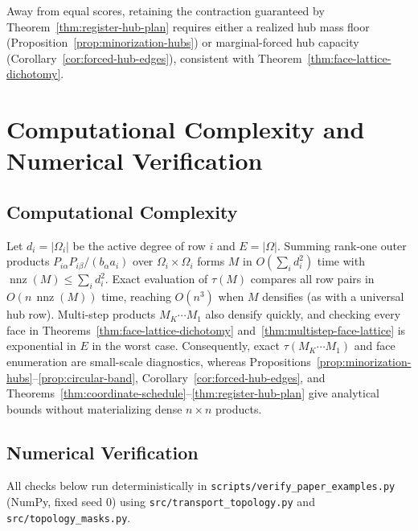 \documentclass[10pt]{article}
\begin{document}
Away from equal scores, retaining the contraction guaranteed by Theorem~\ref{thm:register-hub-plan} requires either a realized hub mass floor (Proposition~\ref{prop:minorization-hubs}) or marginal-forced hub capacity (Corollary~\ref{cor:forced-hub-edges}), consistent with Theorem~\ref{thm:face-lattice-dichotomy}.

\section{Computational Complexity and Numerical Verification}
\label{sec:verification}

\subsection{Computational Complexity}

Let $d_i = |\Omega_i|$ be the active degree of row $i$ and $E = |\Omega|$. Summing rank-one outer products $P_{i\alpha}P_{i\beta}/(b_\alpha a_i)$ over $\Omega_i \times \Omega_i$ forms $M$ in $O(\sum_i d_i^2)$ time with $\operatorname{nnz}(M) \le \sum_i d_i^2$. Exact evaluation of $\tau(M)$ compares all row pairs in $O(n\,\operatorname{nnz}(M))$ time, reaching $O(n^3)$ when $M$ densifies (as with a universal hub row). Multi-step products $M_K\cdots M_1$ also densify quickly, and checking every face in Theorems~\ref{thm:face-lattice-dichotomy} and~\ref{thm:multistep-face-lattice} is exponential in $E$ in the worst case. Consequently, exact $\tau(M_K\cdots M_1)$ and face enumeration are small-scale diagnostics, whereas Propositions~\ref{prop:minorization-hubs}--\ref{prop:circular-band}, Corollary~\ref{cor:forced-hub-edges}, and Theorems~\ref{thm:coordinate-schedule}--\ref{thm:register-hub-plan} give analytical bounds without materializing dense $n\times n$ products.

\subsection{Numerical Verification}
\label{sec:numerical}

All checks below run deterministically in \texttt{scripts/verify\_paper\_examples.py} (NumPy, fixed seed $0$) using \texttt{src/transport\_topology.py} and \texttt{src/topology\_masks.py}.
\end{document}
